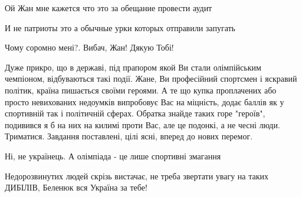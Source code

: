 \begin{itemize}
 

Ой Жан мне кажется что это за обещание провести аудит

И не патриоты это а обычные урки которых отправили запугать

 
Чому соромно мені?. Вибач, Жан! Дякую Тобі!

 

Дуже прикро, що в державі, під прапором якой Ви стали олімпійським чемпіоном,
відбуваються такі події. Жане, Ви професійний спортсмен і яскравий політик,
країна пишається своїми героями. А те що купка проплачених або просто
невихованих недоумків випробовує Вас на міцність, додає баллів як у спортивній
так і політичній сферах. Обратка знайде таких горе "героїв", подивився я б на
них на килимі проти Вас, але це подонкі, а не чесні люди. Триматися. Завдання
поставлені, цілі ясні, вперед до нових перемог.

 
Ні, не українець. А олімпіада - це лише спортивні змагання

 
Недорозвинутих людей скрізь вистачає, не треба звертати увагу на таких ДИБІЛІВ, Беленюк вся Україна за тебе!

 

\end{itemize}
